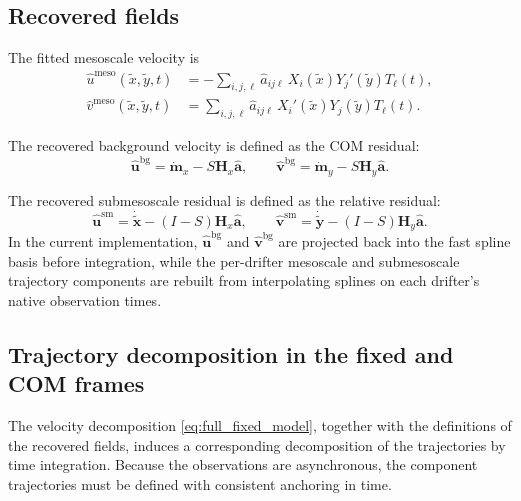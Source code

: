 \documentclass{article}
\begin{document}
\subsection{Recovered fields}

The fitted mesoscale velocity is
\begin{align}
\hat{u}^{\mathrm{meso}}(\tilde{x},\tilde{y},t)
&=
-\sum_{i,j,\ell}\hat{a}_{ij\ell}\,X_i(\tilde{x})Y_j'(\tilde{y})T_\ell(t),
\\
\hat{v}^{\mathrm{meso}}(\tilde{x},\tilde{y},t)
&=
\sum_{i,j,\ell}\hat{a}_{ij\ell}\,X_i'(\tilde{x})Y_j(\tilde{y})T_\ell(t).
\end{align}

The recovered background velocity is defined as the COM residual:
\begin{equation}
\hat{\mathbf{u}}^{\mathrm{bg}}
=
\dot{\mathbf{m}}_x
-
S\mathbf{H}_x\hat{\mathbf a},
\qquad
\hat{\mathbf{v}}^{\mathrm{bg}}
=
\dot{\mathbf{m}}_y
-
S\mathbf{H}_y\hat{\mathbf a}.
\end{equation}

The recovered submesoscale residual is defined as the relative residual:
\begin{equation}
\hat{\mathbf{u}}^{\mathrm{sm}}
=
\dot{\tilde{\mathbf{x}}}
-
(I-S)\mathbf{H}_x\hat{\mathbf a},
\qquad
\hat{\mathbf{v}}^{\mathrm{sm}}
=
\dot{\tilde{\mathbf{y}}}
-
(I-S)\mathbf{H}_y\hat{\mathbf a}.
\end{equation}
In the current implementation, $\hat{\mathbf{u}}^{\mathrm{bg}}$ and
$\hat{\mathbf{v}}^{\mathrm{bg}}$ are projected back into the fast spline basis before
integration, while the per-drifter mesoscale and submesoscale trajectory components are
rebuilt from interpolating splines on each drifter's native observation times.

\subsection{Trajectory decomposition in the fixed and COM frames}

The velocity decomposition \eqref{eq:full_fixed_model}, together with the
definitions of the recovered fields, induces a corresponding decomposition
of the trajectories by time integration. Because the observations are
asynchronous, the component trajectories must be defined with consistent
anchoring in time.
\end{document}
